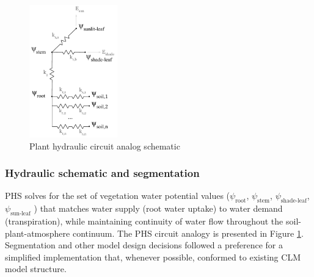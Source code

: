 \documentclass[draft,linenumbers]{agujournal}
\begin{document}
  \begin{figure}[h]
     \centering
     \includegraphics[width=9pc]{../figs/circuit.pdf}
     \caption{Plant hydraulic circuit analog schematic}
     \label{circuit}
  \end{figure}

  \subsubsection{Hydraulic schematic and segmentation}
  PHS solves for the set of vegetation water potential values 
  ($\psi_{\text{root}}$, $\psi_{\text{stem}}$, $\psi_{\text{shade-leaf}}$, $\psi_{\text{sun-leaf}}$ ) 
  that matches water supply (root water uptake) to water demand (transpiration), 
  while maintaining continuity of water flow throughout the soil-plant-atmosphere continuum.
  The PHS circuit analogy is presented in Figure \ref{circuit}.
   Segmentation and other model design decisions followed a preference for a simplified implementation that,
  whenever possible, conformed to existing CLM model structure.
  
\end{document}
